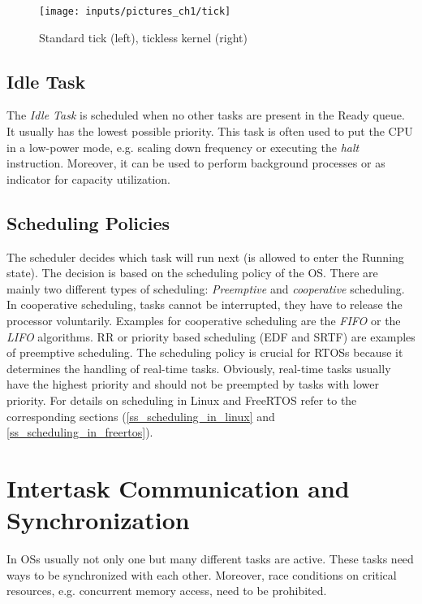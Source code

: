 \begin{figure}[htb]
	\begin{center}
		\texttt{[image: inputs/pictures\_ch1/tick]}
		\caption[Standard and tickless kernel]{Standard tick (left), tickless kernel (right) \cite{barry:ftssp}} \label{fig_tick}
	\end{center}
\end{figure}

\subsection{Idle Task}
The \textit{Idle Task} is scheduled when no other tasks are present in the Ready queue.
It usually has the lowest possible priority.
This task is often used to put the \ac{CPU} in a low-power mode, e.g. scaling down frequency or executing the \textit{halt} instruction. 
Moreover, it can be used to perform background processes or as indicator for capacity utilization.  
  
\subsection{Scheduling Policies}\label{ss_scheduling_policy} 
The scheduler decides which task will run next (is allowed to enter the Running state). 
The decision is based on the scheduling policy of the \ac{OS}.
There are mainly two different types of scheduling: \textit{Preemptive} and \textit{cooperative} scheduling.
In cooperative scheduling, tasks cannot be interrupted, they have to release the processor voluntarily. 
Examples for cooperative scheduling are the \textit{\ac{FIFO}} or the \textit{\ac{LIFO}} algorithms.
\ac{RR} or priority based scheduling (\ac{EDF} and \ac{SRTF}) are examples of preemptive scheduling.
The scheduling policy is crucial for \acp{RTOS} because it determines the handling of real-time tasks.
Obviously, real-time tasks usually have the highest priority and should not be preempted by tasks with lower priority.
For details on scheduling in Linux and FreeRTOS refer to the corresponding sections (\ref{ss_scheduling_in_linux} and \ref{ss_scheduling_in_freertos}).

\section{Intertask Communication and Synchronization}\label{s_intertask_communication}
In \acp{OS} usually not only one but many different tasks are active.
These tasks need ways to be synchronized with each other.
Moreover, race conditions on critical resources, e.g. concurrent memory access, need to be prohibited.

